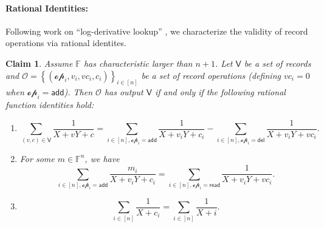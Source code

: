 \documentclass[11pt]{article} %
\newcommand{\F}{\ensuremath{\mathbb F}\xspace}
\newcommand{\sett}[2]{\ensuremath{\set{#1}_{#2}}\xspace}
\newcommand{\set}[1]{\ensuremath{\left\{#1\right\}}\xspace}
\newcommand{\sumi}[1]{\sum_{i\in[#1]}}
\newtheorem{claim}[lemma]{Claim}
\newcommand{\add}{\ensuremath{\mathsf{add}}\xspace}
\newcommand{\del}{\ensuremath{\mathsf{del}}\xspace}
\renewcommand{\read}{\ensuremath{\mathsf{read}}\xspace}
\newcommand{\ops}{\ensuremath{\mathcal{O}}\xspace}
\newcommand{\op}{\ensuremath{\mathscr{op}}\xspace}
\newcommand{\recset}{\ensuremath{\mathsf{V}}\xspace}
\begin{document}
\paragraph{Rational Identities:}
Following work on ``log-derivative lookup'' \cite{bplusplus,logup}, we characterize the validity of record operations via rational identites.
\begin{claim}\label{clm:reducetologder}
Assume $\F$ has characteristic larger than $n+1$.
Let \recset be a set of records and $\ops=\sett{(\op_i,v_i,vc_i,c_i)}{i\in [n]}$ be a set of record operations (defining $vc_i=0$ when $\op_i=\add$).
Then \ops has output \recset if and only if the following rational function identities hold:
\begin{enumerate}
 \item \[\sum_{(v,c)\in \recset}\frac{1}{X+vY+c}=\sum_{i\in [n],\op_i=\add}\frac{1}{X+v_iY+c_i}-\sum_{i\in [n]   , \op_i=\del}\frac{1}{X+v_iY+vc_i}.\]
 \item For some $m\in \F^n$,
 we have
 \[\sum_{i\in [n],\op_i=\add}\frac{m_i}{X+v_iY+c_i}=\sum_{i\in [n], \op_i=\read}\frac{1}{X+v_iY+vc_i}.\]
 \item \[\sumi{n}\frac{1}{X+c_i}=\sumi{n}\frac{1}{X+i}.\]
\end{enumerate}
\end{claim}
\end{document}
